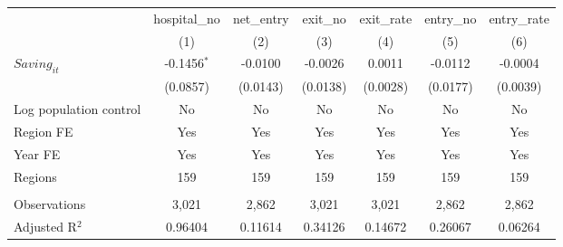 \begingroup
\centering
\begin{tabular}{lcccccc}
   \toprule
                          & hospital\_no  & net\_entry  & exit\_no  & exit\_rate  & entry\_no  & entry\_rate \\    
                          & (1)           & (2)         & (3)       & (4)         & (5)        & (6)\\  
   \midrule 
   $Saving_{it}$          & -0.1456$^{*}$ & -0.0100     & -0.0026   & 0.0011      & -0.0112    & -0.0004\\   
                          & (0.0857)      & (0.0143)    & (0.0138)  & (0.0028)    & (0.0177)   & (0.0039)\\   
   Log population control & No            & No          & No        & No          & No         & No\\  
   Region FE              & Yes           & Yes         & Yes       & Yes         & Yes        & Yes\\  
   Year FE                & Yes           & Yes         & Yes       & Yes         & Yes        & Yes\\  
   Regions                & 159           & 159         & 159       & 159         & 159        & 159\\  
    \\
   Observations           & 3,021         & 2,862       & 3,021     & 3,021       & 2,862      & 2,862\\  
   Adjusted R$^2$         & 0.96404       & 0.11614     & 0.34126   & 0.14672     & 0.26067    & 0.06264\\  
   \bottomrule
\end{tabular}
\par\endgroup

